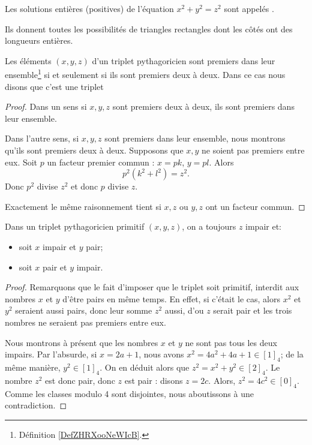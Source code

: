 \begin{definition}
	Les solutions entières (positives) de l'équation \( x^2+y^2=z^2\) sont appelés .
\end{definition}

Ils donnent toutes les possibilités de triangles rectangles dont les côtés ont des longueurs entières.

\begin{proposition}	\label{PROPooUWNPooDwsOtJ}
	Les éléments \( (x,y,z)\) d'un triplet pythagoricien sont premiers dans leur ensemble\footnote{Définition \ref{DefZHRXooNeWIcB}.} si et seulement si ils sont premiers deux à deux. Dans ce cas nous disons que c'est une triplet 
\end{proposition}

\begin{proof}
	Dans un sens si \( x,y,z\) sont premiers deux à deux, ils sont premiers dans leur ensemble.

	Dans l'autre sens, si \( x,y,z\) sont premiers dans leur ensemble, nous montrons qu'ils sont premiers deux à deux. Supposons que \( x,y\) ne soient pas premiers entre eux. Soit \( p\) un facteur premier commun : \( x=pk\), \( y=pl\). Alors
	\begin{equation}
		p^2(k^2+l^2)=z^2.
	\end{equation}
	Donc \( p^2\) divise \( z^2\) et donc \( p\) divise \( z\).

	Exactement le même raisonnement tient si \( x,z\) ou \( y,z\) ont un facteur commun.
\end{proof}

\begin{lemma}    \label{LemTripletsPythagoriciensPrimitifs}
	Dans un triplet pythagoricien primitif \( (x, y, z) \), on a toujours \( z\) impair et:
	\begin{itemize}
		\item
		      soit \( x\) impair et \( y\) pair;
		\item
		      soit \( x\) pair et \( y\) impair.
	\end{itemize}
\end{lemma}

\begin{proof}
	Remarquons que le fait d'imposer que le triplet soit primitif, interdit aux nombres \( x\) et \( y\) d'être pairs en même temps. En effet, si c'était le cas, alors \( x^2 \) et \( y^2 \) seraient aussi pairs, donc leur somme \( z^2 \) aussi, d'ou \( z\) serait pair et les trois nombres ne seraient pas premiers entre eux.

	Nous montrons à présent que les nombres \( x\) et \( y\) ne sont pas tous les deux impairs. Par l'absurde, si \( x=2a+1\), nous avons \( x^2=4a^2+4a+1\in [1]_4\); de la même manière,  \( y^2 \in [1]_4\). On en déduit alors que \( z^2=x^2+y^2\in [2]_4\). Le nombre \(  z^2\) est donc pair, donc \( z\) est pair : disons \( z=2c\). Alors, \( z^2=4c^2\in [0]_4\). Comme les classes modulo 4 sont disjointes, nous aboutissons à une contradiction.
\end{proof}

